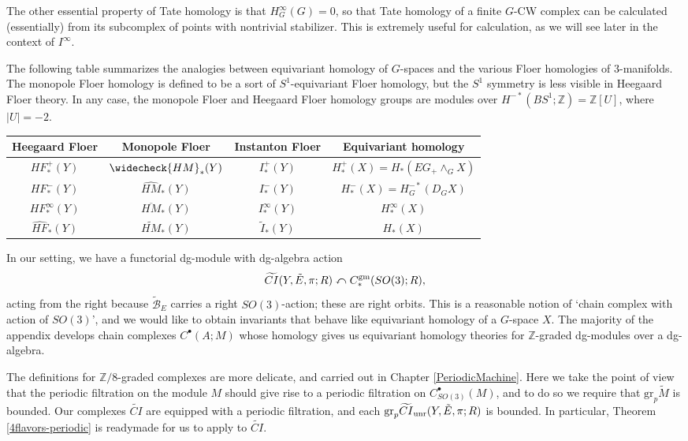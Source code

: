 \documentclass{memo-l}
\theoremstyle{definition}
\theoremstyle{remark}
\numberwithin{section}{chapter}
\numberwithin{equation}{chapter}
\begin{document}
The other essential property of Tate homology is that $H^\infty_G(G) = 0$, so that Tate homology of a finite $G$-CW complex can be calculated (essentially) from its subcomplex of points with nontrivial stabilizer. This is extremely useful for calculation, as we will see later in the context of $I^\infty$.

The following table summarizes the analogies between equivariant homology of $G$-spaces and the various Floer homologies of 3-manifolds. The monopole Floer homology is defined to be a sort of $S^1$-equivariant Floer homology, but the $S^1$ symmetry is less visible in Heegaard Floer theory. In any case, the monopole Floer and Heegaard Floer homology groups are modules over $H^{-*}(BS^1;\mathbb Z) = \mathbb Z[U]$, where $|U| = -2$.

\renewcommand{\arraystretch}{1.4}
\begin{center}
\begin{tabular}{|c|c|c|c|}
\hline
Heegaard Floer & Monopole Floer & Instanton Floer & Equivariant homology\\
\hline
\hline
$HF^+_*(Y)$ & $\widecheck{HM}_*(Y)$ & $I^+_*(Y)$ & $H^+_*(X) = H_*(EG_+ \wedge_G X)$ \\
\hline
$HF^-_*(Y)$ & $\widehat{HM}_*(Y)$ & $I^-_*(Y)$ & $H^-_*(X) = H^{-*}_G(D_GX)$ \\
\hline
$HF^\infty_*(Y)$ & $\overline{HM}_*(Y)$ & $I^\infty_*(Y)$ & $H^\infty_*(X)$ \\
\hline
$\widehat{HF}_*(Y)$ & $\widetilde{HM}_*(Y)$ & $\widetilde I_*(Y)$ & $H_*(X)$ \\
\hline
\end{tabular}
\newline
\end{center}

\noindent In our setting, we have a functorial dg-module with dg-algebra action $$\widetilde{CI}(Y,\tilde E,\pi;R) \curvearrowleft C_*^{\textup{gm}}(SO(3);R),$$ acting from the right because $\widetilde{\mathcal B}_{E}$ carries a right $SO(3)$-action; these are right orbits. This is a reasonable notion of `chain complex with action of $SO(3)$', and we would like to obtain invariants that behave like equivariant homology of a $G$-space $X$. The majority of the appendix develops chain complexes $C^\bullet(A;M)$ whose homology gives us equivariant homology theories for $\mathbb Z$-graded dg-modules over a dg-algebra.

The definitions for $\mathbb Z/8$-graded complexes are more delicate, and carried out in Chapter \ref{PeriodicMachine}. Here we take the point of view that the periodic filtration on the module $M$ should give rise to a periodic filtration on $C^\bullet_{SO(3)}(M)$, and to do so we require that $\text{gr}_p \tilde M$ is bounded. Our complexes $\widetilde{CI}$ are equipped with a periodic filtration, and each $\text{gr}_p \widetilde{CI}_\textup{unr}(Y, \tilde E, \pi; R)$ is bounded. In particular, Theorem \ref{4flavors-periodic} is readymade for us to apply to $\widetilde{CI}$.
\end{document}
